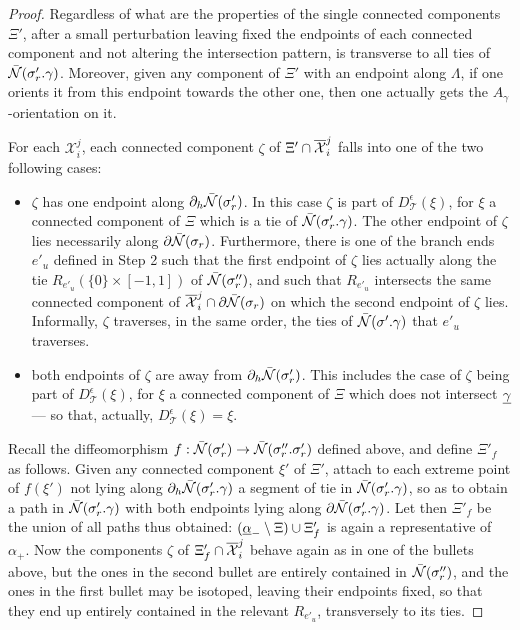 \begin{proof}
Regardless of what are the properties of the single connected components $\Xi'$, after a small perturbation leaving fixed the endpoints of each connected component and not altering the intersection pattern, is transverse to all ties of $\bar{{\mathcal N}}(\sigma'_r.\gamma)$. Moreover, given any component of $\Xi'$ with an endpoint along $\Lambda$, if one orients it from this endpoint towards the other one, then one actually gets the $A_\gamma$-orientation on it.

For each $\mathcal X_i^j$, each connected component $\zeta$ of $\Xi'\cap \overline{\mathcal X}_i^j$ falls into one of the two following cases:
\begin{itemize}
\item $\zeta$ has one endpoint along $\partial_h\bar{{\mathcal N}}(\sigma'_r)$. In this case $\zeta$ is part of $D_{\mathcal T}^\epsilon(\xi)$, for $\xi$ a connected component of $\Xi$ which is a tie of $\bar{{\mathcal N}}(\sigma'_r.\gamma)$. The other endpoint of $\zeta$ lies necessarily along $\partial\bar{{\mathcal N}}(\sigma_r)$. Furthermore, there is one of the branch ends $e'_u$ defined in Step 2 such that the first endpoint of $\zeta$ lies actually along the tie $R_{e'_u}(\{0\}\times[-1,1])$ of $\bar{{\mathcal N}}(\sigma''_r)$, and such that $R_{e'_u}$ intersects the same connected component of $\overline{\mathcal X}_i^j\cap \partial\bar{{\mathcal N}}(\sigma_r)$ on which the second endpoint of $\zeta$ lies. Informally, $\zeta$ traverses, in the same order, the ties of $\bar{{\mathcal N}}(\sigma'.\gamma)$ that $e'_u$ traverses.
\item both endpoints of $\zeta$ are away from $\partial_h\bar{{\mathcal N}}(\sigma'_r)$. This includes the case of $\zeta$ being part of $D_{\mathcal T}^\epsilon(\xi)$, for $\xi$ a connected component of $\Xi$ which does not intersect $\underline{\gamma}$ --- so that, actually, $D_{\mathcal T}^\epsilon(\xi)=\xi$.
\end{itemize}

Recall the diffeomorphism $f:\bar{{\mathcal N}}(\sigma'_r)\rightarrow \bar{{\mathcal N}}(\sigma''_r.\sigma'_r)$ defined above, and define $\Xi'_f$ as follows. Given any connected component $\xi'$ of $\Xi'$, attach to each extreme point of $f(\xi')$ not lying along $\partial_h\bar{{\mathcal N}}(\sigma'_r.\gamma)$ a segment of tie in $\bar{{\mathcal N}}(\sigma'_r.\gamma)$, so as to obtain a path in $\bar{{\mathcal N}}(\sigma'_r.\gamma)$ with both endpoints lying along $\partial\bar{{\mathcal N}}(\sigma'_r.\gamma)$. Let then $\Xi'_f$ be the union of all paths thus obtained: $(\underline{\alpha}_-\setminus\Xi)\cup\Xi'_f$ is again a representative of $\alpha_+$. Now the components $\zeta$ of $\Xi'_f\cap \overline{\mathcal X}_i^j$ behave again as in one of the bullets above, but the ones in the second bullet are entirely contained in $\bar{{\mathcal N}}(\sigma''_r)$, and the ones in the first bullet may be isotoped, leaving their endpoints fixed, so that they end up entirely contained in the relevant $R_{e'_u}$, transversely to its ties.


\end{proof}
